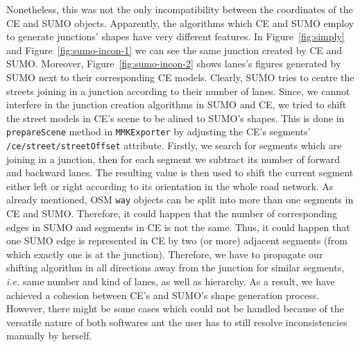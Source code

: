 Nonetheless, this was not the only incompatibility between the coordinates of the CE and SUMO objects. Apparently, the algorithms which CE and SUMO employ to generate junctions' shapes have very different features. In Figure~\ref{fig:simply} and Figure~\ref{fig:sumo-incon-1} we can see the same junction created by CE and SUMO. Moreover, Figure~\ref{fig:sumo-incon-2} shows lanes's figures generated by SUMO next to their corresponding CE models. Clearly, SUMO tries to centre the streets joining in a junction according to their number of lanes. Since, we cannot interfere in the junction creation algorithms in SUMO and CE, we tried to shift the street models in CE's scene to be alined to SUMO's shapes. This is done in \texttt{prepareScene} method in \texttt{MMKExporter} by adjusting the CE's segments' \texttt{/ce/street/streetOffset} attribute. Firstly, we search for segments which are joining in a junction, then for each segment we subtract its number of forward and backward lanes. The resulting value is then used to shift the current segment either left or right according to its orientation in the whole road network. As already mentioned, OSM \texttt{way} objects can be split into more than one segments in CE and SUMO. Therefore, it could happen that the number of corresponding edges in SUMO and segments in CE is not the same. Thus, it could happen that one SUMO edge is represented in CE by two (or more) adjacent segments (from which exactly one is at the junction). Therefore, we have to propagate our shifting algorithm in all directions away from the junction for similar segments, \emph{i.e.} same number and kind of lanes, as well as hierarchy. As a result, we have achieved a cohesion between CE's and SUMO's shape generation process. However, there might be some cases which could not be handled because of the versatile nature of both softwares ant the user has to still resolve inconsistencies manually by herself.\\

